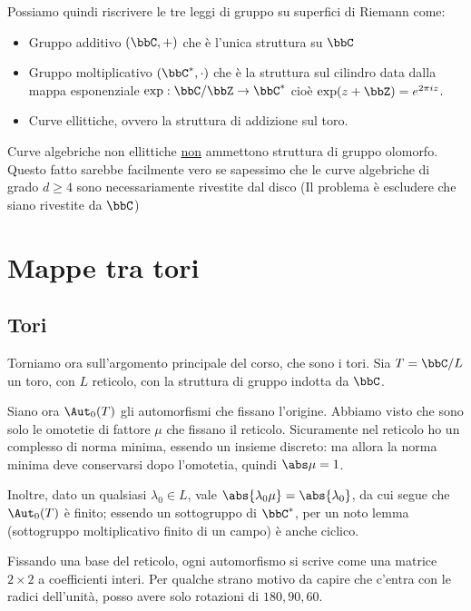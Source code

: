 Possiamo quindi riscrivere le tre leggi di gruppo su superfici di Riemann come:
\begin{itemize}
    \item Gruppo additivo $(\bbC,+)$ che è l'unica struttura su $\bbC$
    \item Gruppo moltiplicativo $(\bbC^\ast,\cdot)$ che è la struttura sul cilindro data dalla mappa esponenziale $\exp: \bbC / \bbZ \to \bbC^\ast$ cioè $\exp(z+\bbZ)=e^{2\pi i z}$.
    \item Curve ellittiche, ovvero la struttura di addizione sul toro.
\end{itemize}

\begin{corollario}
  Curve algebriche non ellittiche \underline{non} ammettono struttura di gruppo olomorfo.
  Questo fatto sarebbe facilmente vero se sapessimo che le curve algebriche di grado $d \ge 4$ sono necessariamente rivestite dal disco (Il problema è escludere che siano rivestite da $\bbC$)
\end{corollario}


\chapter{Mappe tra tori}

	\section{Tori}

	Torniamo ora sull'argomento principale del corso, che sono i tori. Sia $T = \bbC / L$ un toro, con $L$ reticolo, con la struttura di gruppo indotta da $\bbC$.

	Siano ora $\Aut_0(T)$ gli automorfismi che fissano l'origine. Abbiamo visto che sono solo le omotetie di fattore $\mu$ che fissano il reticolo. Sicuramente nel reticolo ho un complesso di norma minima, essendo un insieme discreto: ma allora la norma minima deve conservarsi dopo l'omotetia, quindi $\abs \mu=1$.

	Inoltre, dato un qualsiasi $\lambda_0 \in L$, vale $\abs{\lambda_0 \mu} = \abs {\lambda_0}$, da cui segue che $\Aut_0(T)$ è finito; essendo un sottogruppo di $\bbC^*$, per un noto lemma (sottogruppo moltiplicativo finito di un campo) è anche ciclico.

	Fissando una base del reticolo, ogni automorfismo si scrive come una matrice $2 \times 2$ a coefficienti interi. Per qualche strano motivo da capire che c'entra con le radici dell'unità, %
	posso avere solo rotazioni di $180, 90, 60$.

